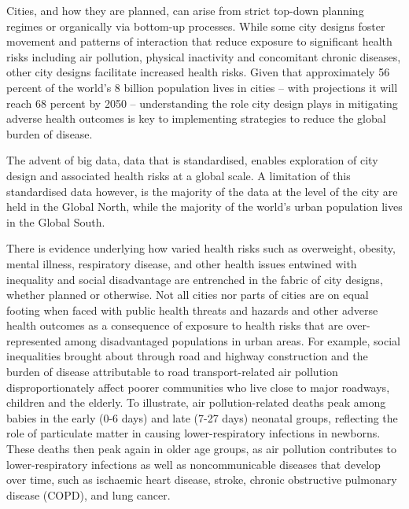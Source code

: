 \documentclass[preprint,12pt]{elsarticle}
\begin{document}
Cities, and how they are planned, can arise from strict top-down planning regimes\cite{mundigo1977city} or organically via bottom-up processes\cite{batty2017thinking}. While some city designs foster movement and patterns of interaction that reduce exposure to significant health risks including air pollution, physical inactivity and concomitant chronic diseases, other city designs facilitate increased health risks\cite{Wijnands2022, Stevenson2016,wang2023flood, stanley2022managing}. Given that approximately 56 percent of the world's 8 billion population lives in cities -- with projections it will reach 68 percent by 2050\cite{WHO2023}  -- understanding the role city design plays in mitigating adverse health outcomes is key to implementing strategies to reduce the global burden of disease. 

The advent of big data, data that is standardised, enables exploration of city design and associated health risks at a global scale. A limitation of this standardised data however, is the majority of the data at the level of the city are held in the Global North, while the majority of the world's urban population lives in the Global South\cite{Smit2021}.

There is evidence underlying  how varied health risks such as overweight, obesity, mental illness, respiratory disease, and other health issues entwined with inequality and social disadvantage are entrenched in the fabric of city designs, whether planned or otherwise\cite{borrell2013factors,xing2016impact,yuchi2020road}. Not all cities nor parts of cities are on equal footing when faced with public health threats and hazards and other adverse health outcomes as a consequence of exposure to health risks that are over-represented among disadvantaged populations in urban areas\cite{KRISHNA2021102046}. For example, social inequalities brought about through road and highway construction\cite{carpenter2010poverty,archer2020white} and the burden of disease attributable to road transport-related air pollution disproportionately affect poorer communities who live close to major roadways, children and the elderly. To illustrate, air pollution-related deaths peak among babies in the early (0-6 days) and late (7-27 days) neonatal groups, reflecting the role of particulate matter in causing lower-respiratory infections in newborns. These deaths then peak again in older age groups, as air pollution contributes to lower-respiratory infections as well as noncommunicable diseases that develop over time, such as ischaemic heart disease, stroke, chronic obstructive pulmonary disease (COPD), and lung cancer\cite{boogaard2022long}. 
\end{document}
